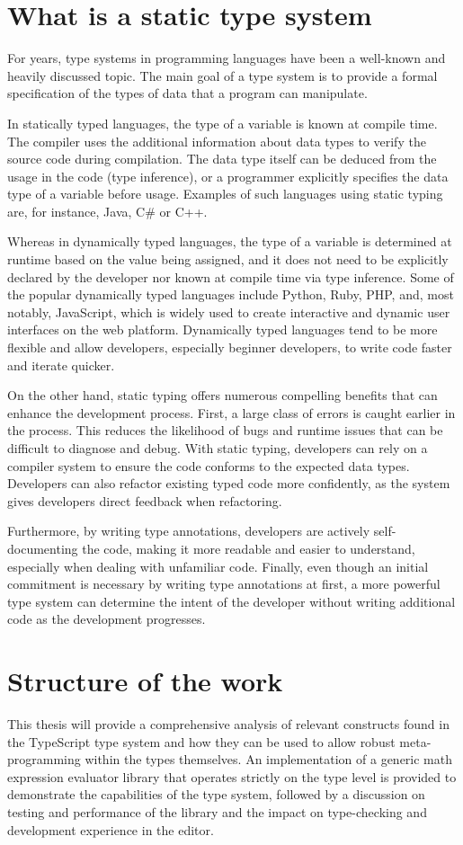 \section{What is a static type system}

For years, type systems in programming languages have been a well-known and heavily discussed topic. The main goal of a type system is to provide a formal specification of the types of data that a program can manipulate.

In statically typed languages, the type of a variable is known at compile time. The compiler uses the additional information about data types to verify the source code during compilation. The data type itself can be deduced from the usage in the code (type inference), or a programmer explicitly specifies the data type of a variable before usage. Examples of such languages using static typing are, for instance, Java, C\# or C++.

Whereas in dynamically typed languages, the type of a variable is determined at runtime based on the value being assigned, and it does not need to be explicitly declared by the developer nor known at compile time via type inference. Some of the popular dynamically typed languages include Python, Ruby, PHP, and, most notably, JavaScript, which is widely used to create interactive and dynamic user interfaces on the web platform. Dynamically typed languages tend to be more flexible and allow developers, especially beginner developers, to write code faster and iterate quicker.

On the other hand, static typing offers numerous compelling benefits that can enhance the development process. First, a large class of errors is caught earlier in the process. This reduces the likelihood of bugs and runtime issues that can be difficult to diagnose and debug. With static typing, developers can rely on a compiler system to ensure the code conforms to the expected data types. Developers can also refactor existing typed code more confidently, as the system gives developers direct feedback when refactoring.

Furthermore, by writing type annotations, developers are actively self-documenting the code, making it more readable and easier to understand, especially when dealing with unfamiliar code. Finally, even though an initial commitment is necessary by writing type annotations at first, a more powerful type system can determine the intent of the developer without writing additional code as the development progresses.

\section{Structure of the work}

This thesis will provide a comprehensive analysis of relevant constructs found in the TypeScript type system and how they can be used to allow robust meta-programming within the types themselves. An implementation of a generic math expression evaluator library that operates strictly on the type level is provided to demonstrate the capabilities of the type system, followed by a discussion on testing and performance of the library and the impact on type-checking and development experience in the editor.
